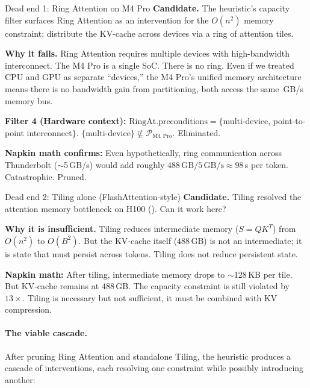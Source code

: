 \documentclass[10pt,twocolumn]{article}
\newcommand{\cvalint}[1]{\pgfmathprintnumber[fixed, precision=0, 1000 sep={\,}]{#1}}
\newcommand{\EdgeKVTotalGB}{488}  %
\begin{document}
\begin{errorcase}{Dead end 1: Ring Attention on M4 Pro}
\textbf{Candidate.} The heuristic's capacity filter surfaces Ring Attention \citep{liu2023ring} as an intervention for the $O(n^2)$ memory constraint: distribute the KV-cache across devices via a ring of attention tiles.

\textbf{Why it fails.} Ring Attention requires multiple devices with high-bandwidth interconnect. The M4 Pro is a single SoC. There is no ring. Even if we treated CPU and GPU as separate ``devices,'' the M4 Pro's unified memory architecture means there is no bandwidth gain from partitioning, both access the same \cvalint{\EdgeBWGBs}\,GB/s memory bus.

\textbf{Filter 4 (Hardware context):} $\text{RingAt}.\text{preconditions} = \{$multi-device, point-to-point interconnect$\}$. $\{$multi-device$\} \not\subseteq \mathcal{P}_{\text{M4 Pro}}$. Eliminated.

\textbf{Napkin math confirms:} Even hypothetically, ring communication across Thunderbolt ($\sim$5\,GB/s) would add roughly $\EdgeKVTotalGB{}\,\text{GB} / 5\,\text{GB/s} \approx 98$\,s per token. Catastrophic. Pruned.
\end{errorcase}

\begin{errorcase}{Dead end 2: Tiling alone (FlashAttention-style)}
\textbf{Candidate.} Tiling resolved the attention memory bottleneck on H100 (). Can it work here?

\textbf{Why it is insufficient.} Tiling reduces intermediate memory ($S = QK^T$) from $O(n^2)$ to $O(B^2)$. But the KV-cache itself ($\EdgeKVTotalGB$\,GB) is not an intermediate; it is state that must persist across tokens. Tiling does not reduce persistent state.

\textbf{Napkin math:} After tiling, intermediate memory drops to $\sim$128\,KB per tile. But KV-cache remains at $\EdgeKVTotalGB$\,GB. The capacity constraint is still violated by $13\times$. Tiling is necessary but not sufficient, it must be combined with KV compression.
\end{errorcase}

\paragraph{The viable cascade.} After pruning Ring Attention and standalone Tiling, the heuristic produces a cascade of interventions, each resolving one constraint while possibly introducing another:
\end{document}
